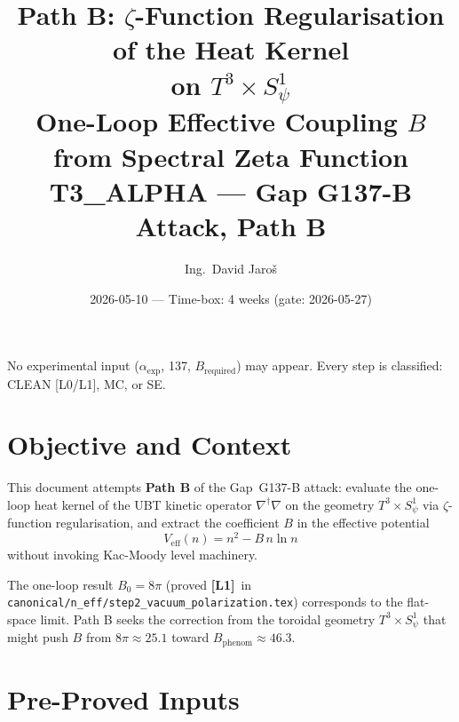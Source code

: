 \documentclass[12pt,a4paper]{article}
\title{\textbf{Path B: $\zeta$-Function Regularisation of the Heat Kernel\\
  on $T^3 \times S^1_\psi$}\\[6pt]
  \large One-Loop Effective Coupling $B$ from Spectral Zeta Function\\[4pt]
  \normalsize T3\_ALPHA — Gap G137-B Attack, Path B}
\author{Ing.\ David Jaroš}
\date{2026-05-10 — Time-box: 4 weeks (gate: 2026-05-27)}
\theoremstyle{definition}
\theoremstyle{remark}
\newcommand{\Lone}{\textbf{[L1]}}
\begin{document}
\maketitle

\begin{tcolorbox}[enhanced,colback=orange!5!white,colframe=orange!60!black,
  arc=3pt,boxrule=1.2pt,title={\textbf{Hard Rules (R1--R5)}}]
No experimental input ($\alpha_{\exp}$, 137, $B_{\mathrm{required}}$) may
appear.  Every step is classified: CLEAN [L0/L1], MC, or SE.
\end{tcolorbox}

\tableofcontents

\section{Objective and Context}
\label{sec:obj}

This document attempts \textbf{Path B} of the Gap~G137-B attack: evaluate
the one-loop heat kernel of the UBT kinetic operator $\nabla^\dagger\nabla$
on the geometry $T^3 \times S^1_\psi$ via $\zeta$-function regularisation,
and extract the coefficient $B$ in the effective potential
\[
  V_{\mathrm{eff}}(n) = n^2 - B\,n\ln n
\]
without invoking Kac-Moody level machinery.

The one-loop result $B_0 = 8\pi$ (proved \Lone\ in
\texttt{canonical/n\_eff/step2\_vacuum\_polarization.tex}) corresponds to
the flat-space limit.  Path B seeks the correction from the toroidal geometry
$T^3 \times S^1_\psi$ that might push $B$ from $8\pi \approx 25.1$ toward
$B_{\mathrm{phenom}} \approx 46.3$.

\section{Pre-Proved Inputs}
\label{sec:inputs}
\end{document}
